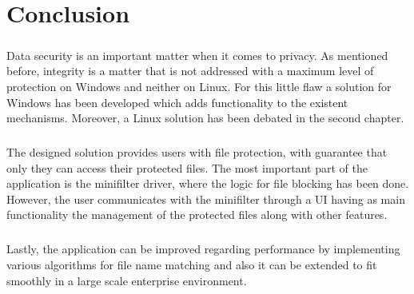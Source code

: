 \chapter{Conclusion}
\paragraph{}
Data security is an important matter when it comes to privacy. As mentioned before, integrity is a matter that is not addressed with a maximum level of protection on Windows and neither on Linux. For this little flaw a solution for Windows has been developed which adds functionality to the existent mechanisms. Moreover, a Linux solution has been debated in the second chapter.

\paragraph{}
The designed solution provides users with file protection, with guarantee that only they can access their protected files. The most important part of the application is the minifilter driver, where the logic for file blocking has been done. However, the user communicates with the minifilter through a UI having as main functionality the management of the protected files along with other features.

\paragraph{}
Lastly, the application can be improved regarding performance by implementing various algorithms for file name matching and also it can be extended to fit smoothly in a large scale enterprise environment.